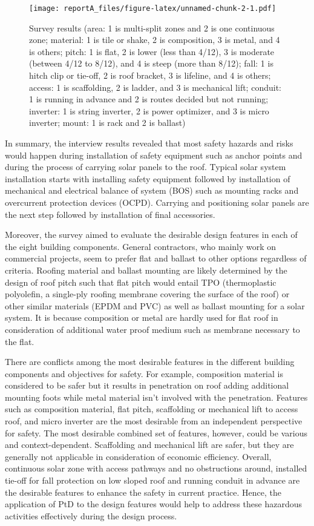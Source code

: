 \documentclass[]{article}
\begin{document}
\begin{figure}
\centering
\texttt{[image: reportA\_files/figure-latex/unnamed-chunk-2-1.pdf]}
\caption{Survey results (area: 1 is multi-split zones and 2 is one
continuous zone; material: 1 is tile or shake, 2 is composition, 3 is
metal, and 4 is others; pitch: 1 is flat, 2 is lower (less than 4/12), 3
is moderate (between 4/12 to 8/12), and 4 is steep (more than 8/12);
fall: 1 is hitch clip or tie-off, 2 is roof bracket, 3 is lifeline, and
4 is others; access: 1 is scaffolding, 2 is ladder, and 3 is mechanical
lift; conduit: 1 is running in advance and 2 is routes decided but not
running; inverter: 1 is string inverter, 2 is power optimizer, and 3 is
micro inverter; mount: 1 is rack and 2 is ballast)}
\end{figure}

In summary, the interview results revealed that most safety hazards and
risks would happen during installation of safety equipment such as
anchor points and during the process of carrying solar panels to the
roof. Typical solar system installation starts with installing safety
equipment followed by installation of mechanical and electrical balance
of system (BOS) such as mounting racks and overcurrent protection
devices (OCPD). Carrying and positioning solar panels are the next step
followed by installation of final accessories.

Moreover, the survey aimed to evaluate the desirable design features in
each of the eight building components. General contractors, who mainly
work on commercial projects, seem to prefer flat and ballast to other
options regardless of criteria. Roofing material and ballast mounting
are likely determined by the design of roof pitch such that flat pitch
would entail TPO (thermoplastic polyolefin, a single-ply roofing
membrane covering the surface of the roof) or other similar materials
(EPDM and PVC) as well as ballast mounting for a solar system. It is
because composition or metal are hardly used for flat roof in
consideration of additional water proof medium such as membrane
necessary to the flat.

There are conflicts among the most desirable features in the different
building components and objectives for safety. For example, composition
material is considered to be safer but it results in penetration on roof
adding additional mounting foots while metal material isn't involved
with the penetration. Features such as composition material, flat pitch,
scaffolding or mechanical lift to access roof, and micro inverter are
the most desirable from an independent perspective for safety. The most
desirable combined set of features, however, could be various and
context-dependent. Scaffolding and mechanical lift are safer, but they
are generally not applicable in consideration of economic efficiency.
Overall, continuous solar zone with access pathways and no obstructions
around, installed tie-off for fall protection on low sloped roof and
running conduit in advance are the desirable features to enhance the
safety in current practice. Hence, the application of PtD to the design
features would help to address these hazardous activities effectively
during the design process.
\end{document}
